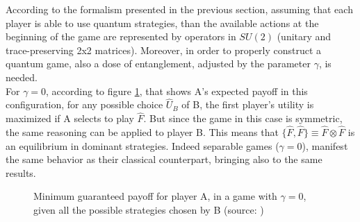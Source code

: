 According to the formalism presented in the previous section, assuming that each player is able to use quantum strategies, than the available actions at the beginning of the game are represented by operators in $SU(2)$ (unitary and trace-preserving 2x2 matrices). Moreover, in order to properly construct a quantum game, also a dose of entanglement, adjusted by the parameter $\gamma$, is needed.\\
For $\gamma=0$, according to figure \ref{fig:utilA_gamma0}, that shows A's expected payoff in this configuration, for any possible choice $\hat{U}_B$ of B, the first player's utility is maximized if A selects to play $\hat{F}$. But since the game in this case is symmetric, the same reasoning can be applied to player B. This means that $\{\hat{F},\hat{F}\}\equiv\hat{F}\otimes\hat{F}$ is an equilibrium in dominant strategies. Indeed separable games ($\gamma=0$), manifest the same behavior as their classical counterpart, bringing also to the same results.\\

\begin{figure}[!ht]
	\centering
	\caption{Minimum guaranteed payoff for player A, in a game with $\gamma=0$, given all the possible strategies chosen by B (source: \cite{Pujatti_github})}
	\label{fig:utilA_gamma0}
\end{figure}

